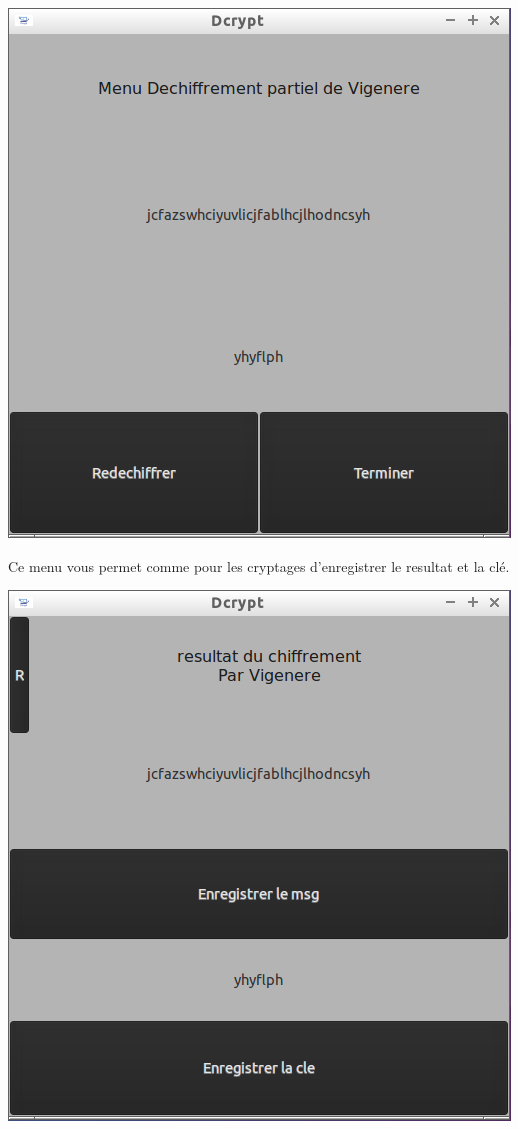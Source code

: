 \documentclass[a4]{article}
\begin{document}
			\begin{center}\includegraphics[scale=0.4]{15.png}\end{center}
			Ce menu vous permet comme pour 
 			les cryptages d'enregistrer le resultat et la clé.
			\begin{center}\includegraphics[scale=0.4]{16.png}\end{center}
		
\end{document}
